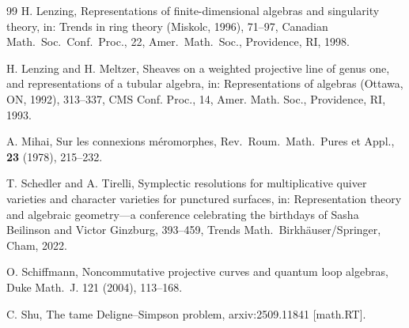 \documentclass[12pt,a4paper]{amsart}
\theoremstyle{plain}
\begin{document}
\begin{thebibliography}{99}
H. Lenzing,
Representations of finite-dimensional algebras and singularity theory,
in: Trends in ring theory (Miskolc, 1996), 71--97,
Canadian Math.\ Soc.\ Conf.\ Proc., 22, Amer.\ Math.\ Soc., Providence, RI, 1998.

H. Lenzing and H. Meltzer, 
Sheaves on a weighted projective line of genus one, and representations of a tubular algebra, 
in: Representations of algebras (Ottawa, ON, 1992), 313--337, 
CMS Conf. Proc., 14, Amer. Math. Soc., Providence, RI, 1993.

A. Mihai,
Sur les connexions m\'eromorphes,
Rev.\ Roum.\ Math.\ Pures et Appl., \textbf{23} (1978), 215--232.

T. Schedler and A. Tirelli, 
Symplectic resolutions for multiplicative quiver varieties and character varieties for punctured surfaces,
in: Representation theory and algebraic geometry---a conference celebrating the birthdays of Sasha Beilinson and Victor Ginzburg, 393--459, Trends Math.\ Birkhäuser/Springer, Cham, 2022.

O. Schiffmann,
Noncommutative projective curves and quantum loop algebras,
Duke Math.\ J. 121 (2004), 113--168.

C. Shu,
The tame Deligne--Simpson problem,
arxiv:2509.11841 [math.RT].
\end{thebibliography}
\end{document}
